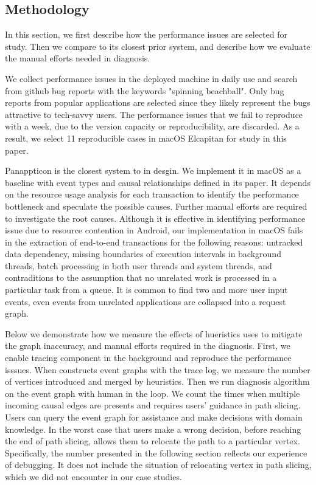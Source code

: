 \subsection{Methodology} \label{sec:methodology}

In this section, we first describe how the performance issues are selected for
study. Then we compare \xxx to its closest prior system, and describe how we
evaluate the manual efforts needed in diagnosis.

We collect performance issues in the deployed machine in daily use and search
from github bug reports with the keywords "spinning beachball". Only bug
reports from popular applications are selected since they likely represent the
bugs attractive to tech-savvy users. The performance issues that we fail to
reproduce with a week, due to the version capacity or reproducibility, are
discarded. As a result, we select 11 reproducible cases in macOS Elcapitan for
study in this paper.


Panappticon is the closest system to \xxx in desgin. We implement it in macOS
as a baseline with event types and causal relationships defined in its paper.
It depends on the resource usage analysis for each transaction to identify
the performance bottleneck and speculate the possible causes. Further manual
efforts are required to investigate the root causes. Although it is effective
in identifying performance issue due to resource contention in Android, our
implementation in macOS fails in the extraction of end-to-end transactions
for the following reasons: untracked data dependency, missing boundaries of
execution intervals in background threads, batch processing in both user threads
and system threads, and contraditions to the assumption that no unrelated work
is processed in a particular task from a queue. It is common to find two and
more user input events, even events from unrelated applications are collapsed
into a request graph.

Below we demonstrate how we measure the effects of hueristics \xxx uses to
mitigate the graph inaccuracy, and manual efforts required in the diagnosis.
First, we enable tracing component in the background and reproduce the
performance isssues.  When \xxx constructs event graphs with the trace log, we
measure the number of vertices introduced and merged by heuristics.  Then we
run \xxx diagnosis algorithm on the event graph with human in the loop. We
count the times when multiple incoming causal edges are presents and \xxx
requires users' guidance in path slicing. Users can query the event graph for
assistance and make decisions with domain knowledge. In the worst case that
users make a wrong decision, before reaching the end of path slicing, \xxx
allows them to relocate the path to a particular vertex. Specifically, the
number presented in the following section reflects our experience of debugging.
It does not include the situation of relocating vertex in path slicing, which
we did not encounter in our case studies.
